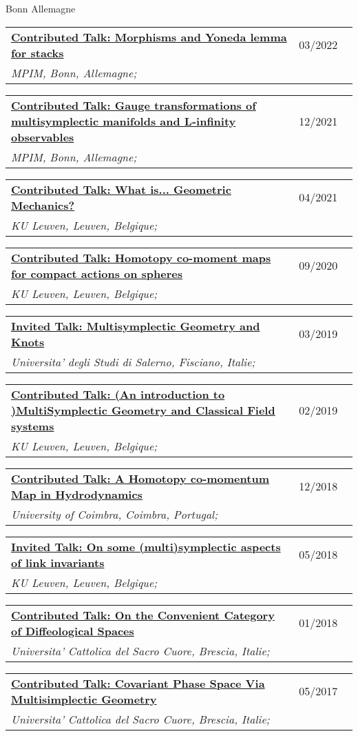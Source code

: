 \documentclass[a4paper]{article}
\newcommand{\longvoice}[8]{
    \begin{tabular}{p{0.83\linewidth} p{0.17\linewidth} }
        \textbf{\href{#3}{#2: #1}} & #4 
        \\ 
        \textit{#5, #6, #7;} & {\small\emph{#8}}
    \end{tabular}
    \vspace{.5em}
    }
\begin{document}
        {Bonn}
        {Allemagne}
        {}
    \longvoice{Morphisms and Yoneda lemma for stacks}
        {Contributed Talk}
        {https://www.dropbox.com/s/rfu7cw1plq0wpzb/2203-Bonn-StackMorphisms.pdf?dl=0}
        {03/2022}
        {MPIM}
        {Bonn}
        {Allemagne}
        {}
    \longvoice{Gauge transformations of multisymplectic manifolds and L-infinity observables}
        {Contributed Talk}
        {https://www.dropbox.com/s/x267gvrge9xghq1/2112-Bonn-HigherSeminar.pdf?dl=0}
        {12/2021}
        {MPIM}
        {Bonn}
        {Allemagne}
        {}
    \longvoice{What is... Geometric Mechanics?}
        {Contributed Talk}
        {https://wis.kuleuven.be/agenda/PhdColloquia/ay20-21/copy4_of_PhD-coll-Molag}
        {04/2021}
        {KU Leuven}
        {Leuven}
        {Belgique}
        {}
    \longvoice{Homotopy co-moment maps for compact actions on spheres}
        {Contributed Talk}
        {https://www.researchgate.net/publication/344220375_Homotopy_co-moment_maps_for_compact_actions_on_spheres}
        {09/2020}
        {KU Leuven}
        {Leuven}
        {Belgique}
        {}
    \longvoice{Multisymplectic Geometry and Knots}
        {Invited Talk}
        {https://www.researchgate.net/publication/331939491_Multisymplectic_aspects_of_link_invariants}
        {03/2019}
        {Universita' degli Studi di Salerno}
        {Fisciano}
        {Italie}
        {}
    \longvoice{(An introduction to )MultiSymplectic Geometry and Classical Field systems}
        {Contributed Talk}
        {https://www.dropbox.com/s/q68uv6hbbej8d09/1902-Talk-MultisymplecticFields.pdf?dl=0}
        {02/2019}
        {KU Leuven}
        {Leuven}
        {Belgique}
        {}
    \longvoice{A Homotopy co-momentum Map in Hydrodynamics}
        {Contributed Talk}
        {https://www.researchgate.net/publication/329572409_Homotopy_co-momentum_Map_in_Hydrodynamics}
        {12/2018}
        {University of Coimbra}
        {Coimbra}
        {Portugal}
        {}
    \longvoice{On some (multi)symplectic aspects of link invariants}
        {Invited Talk}
        {https://web.archive.org/web/20180424133109/https://wis.kuleuven.be/agenda/sem-geometry/academic-year-20/201718/seminar_differential_geometry_Miti}
        {05/2018}
        {KU Leuven}
        {Leuven}
        {Belgique}
        {}
    \longvoice{On the Convenient Category of Diffeological Spaces}
        {Contributed Talk}
        {https://www.dropbox.com/s/thm6unntpduynh3/1801-Talk-ConvenientDiffeological.pdf?dl=0}
        {01/2018}
        {Universita' Cattolica del Sacro Cuore}
        {Brescia}
        {Italie}
        {}
    \longvoice{Covariant Phase Space Via Multisimplectic Geometry}
        {Contributed Talk}
        {https://www.researchgate.net/publication/319301194_Notes_on_Covariant_Phase_Space_via_MultiSymplectic_Geometry}
        {05/2017}
        {Universita' Cattolica del Sacro Cuore}
        {Brescia}
        {Italie}
        {}
\end{document}
